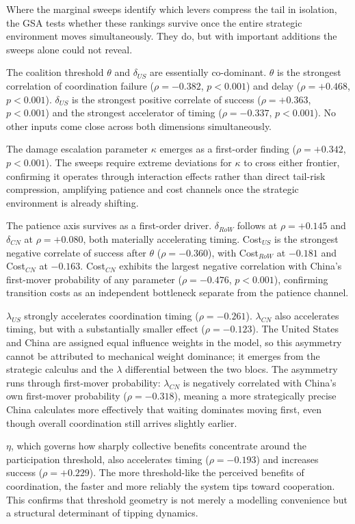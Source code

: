 \documentclass[10pt,a4paper]{article}
\begin{document}
Where the marginal sweeps identify which levers compress the tail in isolation, the GSA tests whether
these rankings survive once the entire strategic environment moves simultaneously. They do, but with
important additions the sweeps alone could not reveal.

The coalition threshold $\theta$ and $\delta_{US}$ are essentially co-dominant. $\theta$ is the strongest correlation of
coordination failure ($\rho = -0.382$, $p < 0.001$) and delay ($\rho = +0.468$, $p < 0.001$). $\delta_{US}$ is the
strongest positive correlate of success ($\rho = +0.363$, $p < 0.001$) and the strongest accelerator of timing
($\rho = -0.337$, $p < 0.001$). No other inputs come close across both dimensions simultaneously.

The damage escalation parameter $\kappa$ emerges as a first-order finding ($\rho = +0.342$, $p < 0.001$). The
sweeps require extreme deviations for $\kappa$ to cross either frontier, confirming it operates through
interaction effects rather than direct tail-risk compression, amplifying patience and cost channels once the
strategic environment is already shifting.

The patience axis survives as a first-order driver. $\delta_{RoW}$ follows at $\rho = +0.145$ and $\delta_{CN}$ at $\rho =
+0.080$, both materially accelerating timing. Cost$_{US}$ is the strongest negative correlate of success after $\theta$
($\rho = -0.360$), with Cost$_{RoW}$ at $-0.181$ and Cost$_{CN}$ at $-0.163$. Cost$_{CN}$ exhibits the largest negative
correlation with China's first-mover probability of any parameter ($\rho = -0.476$, $p < 0.001$), confirming
transition costs as an independent bottleneck separate from the patience channel.

$\lambda_{US}$ strongly accelerates coordination timing ($\rho = -0.261$). $\lambda_{CN}$ also accelerates timing, but with a
substantially smaller effect ($\rho = -0.123$). The United States and China are assigned equal influence
weights in the model, so this asymmetry cannot be attributed to mechanical weight dominance; it
emerges from the strategic calculus and the $\lambda$ differential between the two blocs. The asymmetry
runs through first-mover probability:
$\lambda_{CN}$ is negatively correlated with China's own first-mover probability ($\rho = -0.318$), meaning a
more strategically precise China calculates more effectively that waiting dominates moving first, even
though overall coordination still arrives slightly earlier.

$\eta$, which governs how sharply collective benefits concentrate around the participation threshold, also
accelerates timing ($\rho = -0.193$) and increases success ($\rho = +0.229$). The more threshold-like the
perceived benefits of coordination, the faster and more reliably the system tips toward cooperation. This confirms that threshold geometry is
not merely a modelling convenience but a structural determinant of tipping dynamics.
\end{document}
